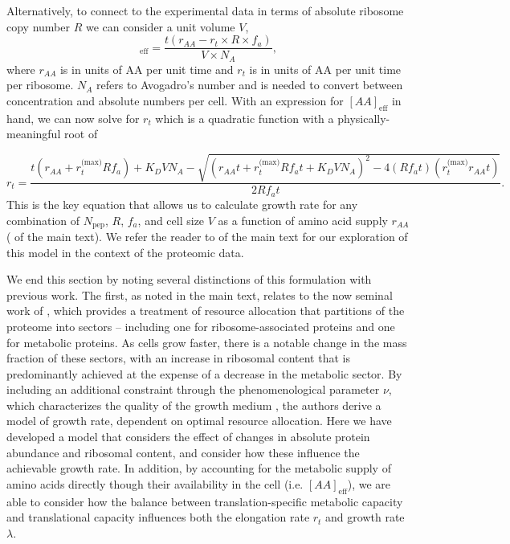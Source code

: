 Alternatively, to connect to the experimental data in terms of absolute ribosome
copy number $R$ we can consider a unit volume $V$,
\begin{equation}
   [AA]_\text{eff} = \frac{t(r_{AA} - r_t \times R \times f_a)}{V \times N_A},
   \label{eq:aa_final}
\end{equation}
where $r_{AA}$ is in units of AA per unit time and $r_t$ is in units of AA per
unit time per ribosome. $N_A$ refers to Avogadro's number and is needed to
convert between  concentration and absolute numbers per cell. With an expression
for $[AA]_\text{eff}$ in hand, we can now solve  for $r_t$
which is a quadratic function with a physically-meaningful root of

\begin{equation}
r_t = \frac{t(r_{AA} + r_t^\text{(max)}Rf_a) + K_D V N_A - \sqrt{(r_{AA}t + r_t^\text{(max)}Rf_at + K_D V N_A)^2 - 4(Rf_at)(r_t^\text{(max)}r_{AA} t)}}{2Rf_at}.
\label{eq:rt_root}
\end{equation}
This is the key equation that allows us to calculate growth rate for any
combination of $N_\text{pep}$, $R$, $f_a$, and cell size $V$ as a function of
amino acid supply $r_{AA}$ ( of the main text). We refer the
reader to  of the main text for our exploration of this
model in the context of the proteomic data.

We end this section by noting several distinctions of this formulation with
previous work. The first, as noted in the main text, relates to the now seminal
work of \cite{scott2010}, which provides a treatment of resource allocation that
partitions of the proteome into sectors -- including one for ribosome-associated
proteins and one for metabolic proteins. As cells grow faster, there is a
notable change in the mass fraction of these sectors, with an increase in
ribosomal content that is predominantly achieved at the expense of a decrease in
the metabolic sector. By including an additional constraint through the
phenomenological parameter $\nu$,  which characterizes the quality of the growth
medium \cite{scott2010, klumpp2013, klumpp2014}, the authors derive a model of
growth rate, dependent on optimal resource allocation. Here we have developed a
model that considers the effect of changes in absolute protein abundance and
ribosomal content, and consider how these influence the achievable growth rate.
In addition, by accounting for the metabolic supply of amino acids directly
though their availability in the cell (i.e. $[AA]_\text{eff}$), we are able to
consider how the balance between translation-specific metabolic capacity and
translational capacity influences both the elongation rate $r_t$ and growth
rate $\lambda$.

